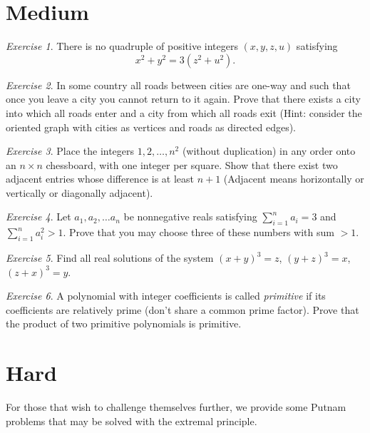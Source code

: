 \documentclass{article}
\theoremstyle{definition}
\theoremstyle{remark}
\newtheorem{exercise}{Exercise}
\begin{document}
\section{Medium}

\begin{exercise}
    There is no quadruple of positive integers $(x, y, z, u)$ satisfying 
    \[x^2 + y^2 = 3(z^{2} + u^{2}). 
    \]
\end{exercise}

\begin{exercise}
    In some country all roads between cities are one-way and such that once you leave a city you cannot return to it again. Prove that there exists a city into which all roads enter and a city from which all roads exit (Hint: consider the oriented graph with cities as vertices and roads as directed edges).  
\end{exercise}

\begin{exercise}
    Place the integers $1, 2, \ldots, n^2$ (without duplication) in any order onto an $n \times n$ chessboard, with one integer per square. Show that there exist two adjacent entries whose difference is at least $n + 1$ (Adjacent means horizontally or vertically or diagonally adjacent). 
\end{exercise}

\begin{exercise}
    Let $a_{1}, a_{2}, \ldots a_{n}$ be nonnegative reals satisfying $\sum_{i = 1}^{n} a_{i} = 3$ and $\sum_{i = 1}^{n} a_{i}^{2} > 1$. Prove that you may choose three of these numbers with sum $> 1$.
\end{exercise}

\begin{exercise}
    Find all real solutions of the system $(x + y)^{3} = z$, $(y + z)^{3} = x$, $(z + x)^{3} = y$. 
\end{exercise}


\begin{exercise}
A polynomial with integer coefficients is called \emph{primitive} if its coefficients are relatively prime (don't share a common prime factor). Prove that the product of two primitive polynomials is primitive.
\end{exercise}


\section{Hard}
For those that wish to challenge themselves further, we provide some Putnam problems that may be solved with the extremal principle.
\end{document}
